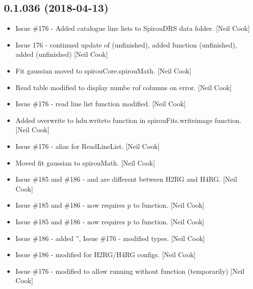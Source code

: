 \documentclass[a4paper,10pt,english]{report}
\begin{document}
\subsection{0.1.036 (2018-04-13)}
\label{\detokenize{misc/changelog:id463}}\begin{itemize}
\item {} 
Issue \#176 - Added catalogue line lists to SpirouDRS data folder.
{[}Neil Cook{]}

\item {} 
Issue 176 - continued update of  (unfinished),
added  function (unfinished), added 
(unfinished) {[}Neil Cook{]}

\item {} 
Fit gaussian moved to spirouCore.spirouMath. {[}Neil Cook{]}

\item {} 
Read table modified to display numbe rof columns on error. {[}Neil Cook{]}

\item {} 
Issue \#176 - read line list function modified. {[}Neil Cook{]}

\item {} 
Added overwrite to hdu.writeto function in spirouFits.writeimage
function. {[}Neil Cook{]}

\item {} 
Issue \#176 - alias for ReadLineList. {[}Neil Cook{]}

\item {} 
Moved fit gaussian to spirouMath. {[}Neil Cook{]}

\item {} 
Issue \#185 and \#186 -  and  are
different between H2RG and H4RG. {[}Neil Cook{]}

\item {} 
Issue \#185 and \#186 -  now requires p to function.
{[}Neil Cook{]}

\item {} 
Issue \#185 and \#186 -  now requires p to function.
{[}Neil Cook{]}

\item {} 
Issue \#186 - added ”, Issue \#176 - modified 
types. {[}Neil Cook{]}

\item {} 
Issue \#186 - modified  for H2RG/H4RG configs. {[}Neil Cook{]}

\item {} 
Issue \#176 - modified to allow running without function (temporarily)
{[}Neil Cook{]}

\end{itemize}
\end{document}
